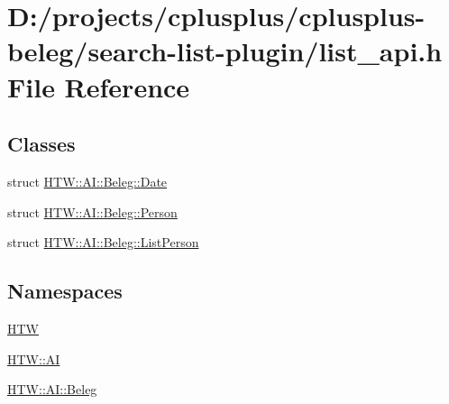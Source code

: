 \hypertarget{search-list-plugin_2list__api_8h}{\section{D\-:/projects/cplusplus/cplusplus-\/beleg/search-\/list-\/plugin/list\-\_\-api.h File Reference}
\label{search-list-plugin_2list__api_8h}
}
\subsection*{Classes}
\begin{DoxyCompactItemize}
\item 
struct \hyperlink{struct_h_t_w_1_1_a_i_1_1_beleg_1_1_date}{H\-T\-W\-::\-A\-I\-::\-Beleg\-::\-Date}
\item 
struct \hyperlink{struct_h_t_w_1_1_a_i_1_1_beleg_1_1_person}{H\-T\-W\-::\-A\-I\-::\-Beleg\-::\-Person}
\item 
struct \hyperlink{struct_h_t_w_1_1_a_i_1_1_beleg_1_1_list_person}{H\-T\-W\-::\-A\-I\-::\-Beleg\-::\-List\-Person}
\end{DoxyCompactItemize}
\subsection*{Namespaces}
\begin{DoxyCompactItemize}
\item 
\hyperlink{namespace_h_t_w}{H\-T\-W}
\item 
\hyperlink{namespace_h_t_w_1_1_a_i}{H\-T\-W\-::\-A\-I}
\item 
\hyperlink{namespace_h_t_w_1_1_a_i_1_1_beleg}{H\-T\-W\-::\-A\-I\-::\-Beleg}
\end{DoxyCompactItemize}
